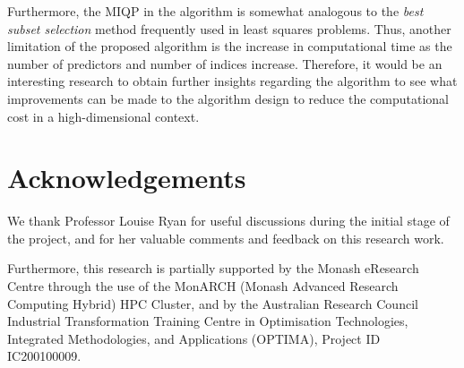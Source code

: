 \documentclass[
  11pt,
  a4paper,
]{article}
\begin{document}
Furthermore, the MIQP in the algorithm is somewhat analogous to the
\emph{best subset selection} method frequently used in least squares
problems. Thus, another limitation of the proposed algorithm is the
increase in computational time as the number of predictors and number of
indices increase. Therefore, it would be an interesting research to
obtain further insights regarding the algorithm to see what improvements
can be made to the algorithm design to reduce the computational cost in
a high-dimensional context.

\section*{Acknowledgements}\label{acknowledgements}

We thank Professor Louise Ryan for useful discussions during the initial
stage of the project, and for her valuable comments and feedback on this
research work.

Furthermore, this research is partially supported by the Monash
eResearch Centre through the use of the MonARCH (Monash Advanced
Research Computing Hybrid) HPC Cluster, and by the Australian Research
Council Industrial Transformation Training Centre in Optimisation
Technologies, Integrated Methodologies, and Applications (OPTIMA),
Project ID IC200100009.~


\printbibliography
\end{document}
